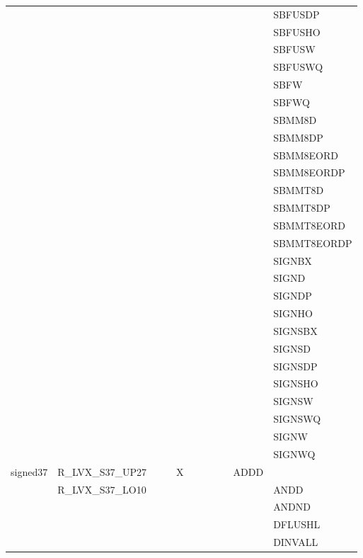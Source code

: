 {\begin{tabular}{|l|l|l|l|l|l|l|l|l|l|l|}
 & & & & & & & & & & \textsf{SBFUSDP} \\
 & & & & & & & & & & \textsf{SBFUSHO} \\
 & & & & & & & & & & \textsf{SBFUSW} \\
 & & & & & & & & & & \textsf{SBFUSWQ} \\
 & & & & & & & & & & \textsf{SBFW} \\
 & & & & & & & & & & \textsf{SBFWQ} \\
 & & & & & & & & & & \textsf{SBMM8D} \\
 & & & & & & & & & & \textsf{SBMM8DP} \\
 & & & & & & & & & & \textsf{SBMM8EORD} \\
 & & & & & & & & & & \textsf{SBMM8EORDP} \\
 & & & & & & & & & & \textsf{SBMMT8D} \\
 & & & & & & & & & & \textsf{SBMMT8DP} \\
 & & & & & & & & & & \textsf{SBMMT8EORD} \\
 & & & & & & & & & & \textsf{SBMMT8EORDP} \\
 & & & & & & & & & & \textsf{SIGNBX} \\
 & & & & & & & & & & \textsf{SIGND} \\
 & & & & & & & & & & \textsf{SIGNDP} \\
 & & & & & & & & & & \textsf{SIGNHO} \\
 & & & & & & & & & & \textsf{SIGNSBX} \\
 & & & & & & & & & & \textsf{SIGNSD} \\
 & & & & & & & & & & \textsf{SIGNSDP} \\
 & & & & & & & & & & \textsf{SIGNSHO} \\
 & & & & & & & & & & \textsf{SIGNSW} \\
 & & & & & & & & & & \textsf{SIGNSWQ} \\
 & & & & & & & & & & \textsf{SIGNW} \\
 & & & & & & & & & & \textsf{SIGNWQ} \\
\hline
\textsf{signed37} & \textsf{R\_LVX\_S37\_UP27} & \textsf{} & \textsf{} & \textsf{X} & \textsf{} & \textsf{} & \textsf{} & \textsf{} & \textsf{ADDD} \\
 & \textsf{R\_LVX\_S37\_LO10} & & & & & & & & & \textsf{ANDD} \\
 & & & & & & & & & & \textsf{ANDND} \\
 & & & & & & & & & & \textsf{DFLUSHL} \\
 & & & & & & & & & & \textsf{DINVALL} \\

\end{tabular}}
